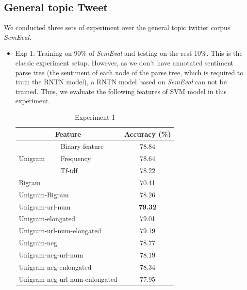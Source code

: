 \subsection{General topic Tweet}
We conducted three sets of experiment over the general topic twitter corpus \textit{SemEval}. 
\begin{itemize}
\item Exp 1: Training on 90\% of \textit{SemEval} and testing on the rest 10\%. 
This is the classic experiment setup. However, as we don't have annotated sentiment parse tree  (the sentiment of each node of the parse tree, which is required to train the RNTN model), a RNTN model based on \textit{SemEval} can not be trained. Thus, we evaluate the following features of SVM model in this experiment. 

\begin{table}[H]
  \begin{center}
    \begin{tabular}{llc}\hline
     \multicolumn{2}{c}{Feature} & Accuracy (\%)     \\\hline
     \multirow{3}{*}{Unigram}    & Binary feature  &  78.84  \\ 
                                 & Frequency       &  78.64  \\ 
                                 & Tf-idf          &  78.22 \\
     \multicolumn{2}{l}{Bigram}                    &  70.41 \\  
     \multicolumn{2}{l}{Unigram-Bigram}            &  78.26 \\         
     \multicolumn{2}{l}{Unigram-url-num}           &  \textbf{79.32} \\
     \multicolumn{2}{l}{Unigram-elongated}         &  79.01 \\
     \multicolumn{2}{l}{Unigram-url-num-elongated} &  79.19 \\
     \multicolumn{2}{l}{Unigram-neg}               &  78.77 \\
     \multicolumn{2}{l}{Unigram-neg-url-num}       &  78.19 \\
     \multicolumn{2}{l}{Unigram-neg-enlongated}    &  78.34 \\
     \multicolumn{2}{l}{Unigram-neg-url-num-enlongated}  &  77.95 \\\hline      
    \end{tabular}
    \end{center}
    \caption{\label{exp5_1} Experiment 1}
\end{table}


\end{itemize}
